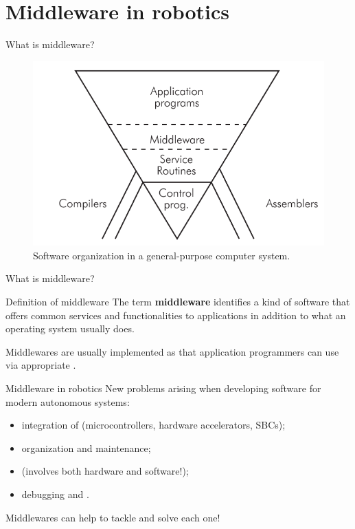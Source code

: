 
\section{Middleware in robotics}
\graphicspath{{figs/section2/}}

\begin{frame}{What is middleware?}
	\begin{figure}
		\centering
		\includegraphics[width=.64\textwidth]{softwarePyramid.png}
		\caption{Software organization in a general-purpose computer system.}
		\label{fig:swpyramid}
	\end{figure}
\end{frame}
\begin{frame}{What is middleware?}
	\begin{block}{Definition of middleware}
		\justifying
		The term \textbf{middleware} identifies a kind of software that offers common services and functionalities to applications in addition to what an operating system usually does.
	\end{block}
	\justifying
	Middlewares are usually implemented as  that application programmers can use via appropriate .
\end{frame}

\begin{frame}{Middleware in robotics}
	\justifying
	New problems arising when developing software for modern autonomous systems:
	\begin{itemize}
		\item integration of  (microcontrollers, hardware accelerators, SBCs);
		\item {} organization and maintenance;
		\item {} (involves both hardware and software!);
		\item debugging and .
	\end{itemize}
	\begin{block}{}
		\centering
		Middlewares can help to tackle and solve each one!
	\end{block}
\end{frame}

